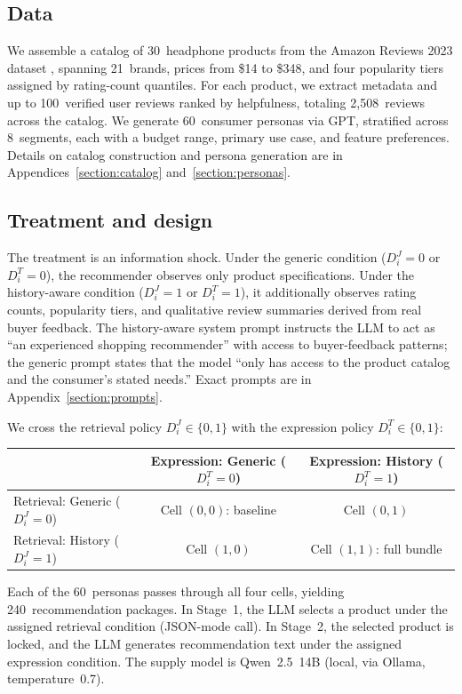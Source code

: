 \documentclass[11pt]{article}
\begin{document}
\subsection{Data}

We assemble a catalog of 30~headphone products from the Amazon Reviews 2023 dataset \citep{hou2024amazon}, spanning 21~brands, prices from \$14 to \$348, and four popularity tiers assigned by rating-count quantiles. For each product, we extract metadata and up to 100~verified user reviews ranked by helpfulness, totaling 2{,}508~reviews across the catalog. We generate 60~consumer personas via GPT, stratified across 8~segments, each with a budget range, primary use case, and feature preferences. Details on catalog construction and persona generation are in Appendices~\ref{section:catalog} and~\ref{section:personas}.

\subsection{Treatment and design}

The treatment is an information shock. Under the generic condition ($D_i^J = 0$ or $D_i^T = 0$), the recommender observes only product specifications. Under the history-aware condition ($D_i^J = 1$ or $D_i^T = 1$), it additionally observes rating counts, popularity tiers, and qualitative review summaries derived from real buyer feedback. The history-aware system prompt instructs the LLM to act as ``an experienced shopping recommender'' with access to buyer-feedback patterns; the generic prompt states that the model ``only has access to the product catalog and the consumer's stated needs.'' Exact prompts are in Appendix~\ref{section:prompts}.

We cross the retrieval policy $D_i^J \in \{0, 1\}$ with the expression policy $D_i^T \in \{0, 1\}$:
\begin{center}
\small
\begin{tabular}{lcc}
\toprule
& Expression: Generic ($D_i^T{=}0$) & Expression: History ($D_i^T{=}1$) \\
\midrule
Retrieval: Generic ($D_i^J{=}0$) & Cell $(0,0)$: baseline & Cell $(0,1)$ \\
Retrieval: History ($D_i^J{=}1$) & Cell $(1,0)$ & Cell $(1,1)$: full bundle \\
\bottomrule
\end{tabular}
\end{center}
Each of the 60~personas passes through all four cells, yielding 240~recommendation packages. In Stage~1, the LLM selects a product under the assigned retrieval condition (JSON-mode call). In Stage~2, the selected product is locked, and the LLM generates recommendation text under the assigned expression condition. The supply model is Qwen~2.5~14B (local, via Ollama, temperature~0.7).
\end{document}
